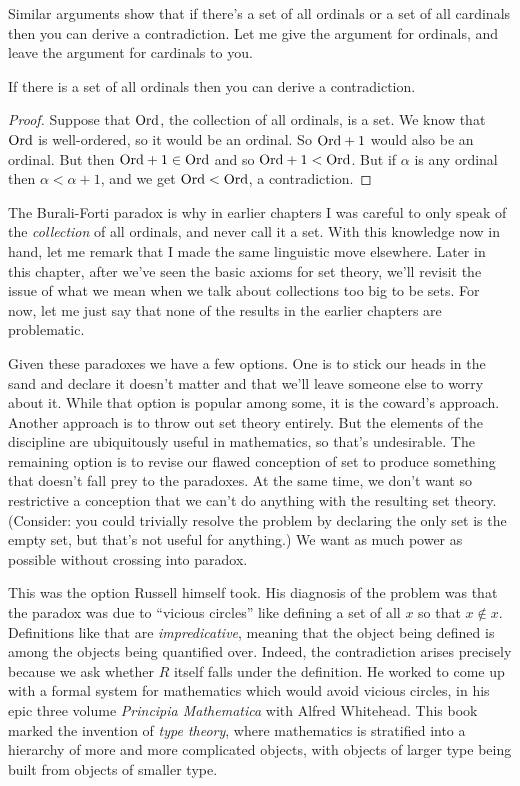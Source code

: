 \documentclass[10pt]{amsart}
\begin{document}
Similar arguments show that if there's a set of all ordinals or a set of all cardinals then you can derive a contradiction. Let me give the argument for ordinals, and leave the argument for cardinals to you.

\begin{theorem}
If there is a set of all ordinals then you can derive a contradiction.
\end{theorem}

\begin{proof}
Suppose that $\mathrm{Ord}$, the collection of all ordinals, is a set. We know that $\mathrm{Ord}$ is well-ordered, so it would be an ordinal. So $\mathrm{Ord} + 1$ would also be an ordinal. But then $\mathrm{Ord} + 1 \in \mathrm{Ord}$ and so $\mathrm{Ord} + 1 < \mathrm{Ord}$. But if $\alpha$ is any ordinal then $\alpha < \alpha + 1$, and we get $\mathrm{Ord} < \mathrm{Ord}$, a contradiction.
\end{proof}

The Burali-Forti paradox is why in earlier chapters I was careful to only speak of the \emph{collection} of all ordinals, and never call it a set. With this knowledge now in hand, let me remark that I made the same linguistic move elsewhere. Later in this chapter, after we've seen the basic axioms for set theory, we'll revisit the issue of what we mean when we talk about collections too big to be sets. For now, let me just say that none of the results in the earlier chapters are problematic.

Given these paradoxes we have a few options. One is to stick our heads in the sand and declare it doesn't matter and that we'll leave someone else to worry about it. While that option is popular among some, it is the coward's approach. Another approach is to throw out set theory entirely. But the elements of the discipline are ubiquitously useful in mathematics, so that's undesirable. The remaining option is to revise our flawed conception of set to produce something that doesn't fall prey to the paradoxes. At the same time, we don't want so restrictive a conception that we can't do anything with the resulting set theory. (Consider: you could trivially resolve the problem by declaring the only set is the empty set, but that's not useful for anything.) We want as much power as possible without crossing into paradox.

This was the option Russell himself took. His diagnosis of the problem was that the paradox was due to ``vicious circles'' like defining a set of all $x$ so that $x \not \in x$. Definitions like that are \emph{impredicative}, meaning that the object being defined is among the objects being quantified over. Indeed, the contradiction arises precisely because we ask whether $R$ itself falls under the definition. He worked to come up with a formal system for mathematics which would avoid vicious circles, in his epic three volume \textit{Principia Mathematica} with Alfred Whitehead. This book marked the invention of \emph{type theory}, where mathematics is stratified into a hierarchy of more and more complicated objects, with objects of larger type being built from objects of smaller type.
\end{document}
